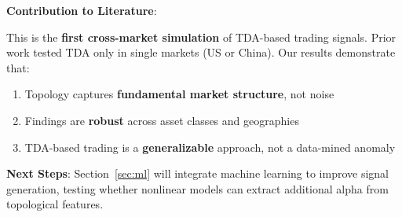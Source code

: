\textbf{Contribution to Literature}:

This is the \textbf{first cross-market simulation} of TDA-based trading signals. Prior work tested TDA only in single markets (US or China). Our results demonstrate that:

\begin{enumerate}
\item Topology captures \textbf{fundamental market structure}, not noise
\item Findings are \textbf{robust} across asset classes and geographies
\item TDA-based trading is a \textbf{generalizable} approach, not a data-mined anomaly
\end{enumerate}

\textbf{Next Steps}: Section~\ref{sec:ml} will integrate machine learning to improve signal generation, testing whether nonlinear models can extract additional alpha from topological features.
